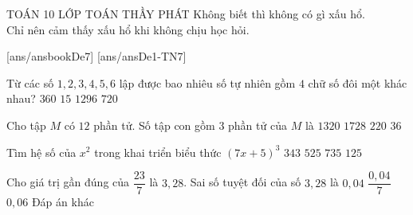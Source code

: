 \begin{name}
	{\tenchude}
	{TOÁN 10}
	{LỚP TOÁN THẦY PHÁT}
	{{Không biết thì không có gì xấu hổ.\\ Chỉ nên cảm thấy xấu hổ khi không chịu học hỏi.}}
\end{name}
[ans/ansbookDe7]
\TN
{}[ans/ansDe1-TN7]
\begin{ex}%
Từ các số $1,2,3,4,5,6$ lập được bao nhiêu số tự nhiên gồm $4$ chữ số đôi một khác nhau?
\choice
{\True $360$}
{$15$}
{$1296$}
{$720$}
\end{ex}

\begin{ex}%
Cho tập $M$ có $12$ phần tử. Số tập con gồm $3$ phần tử của $M$ là
\choice
{$1320$}
{$1728$}
{\True $220$}
{$36$}
\end{ex}

\begin{ex}%
Tìm hệ số của $x^2$  trong khai triển biểu thức $(7x + 5)^{3}$
\choice
{$343$}
{$525$}
{\True $735$}
{$125$}
\end{ex}

\begin{ex}%
Cho giá trị gần đúng của $\dfrac{23}{7}$ là $3{,}28$. Sai số tuyệt đối của số $3{,}28$ là
\choice
{$0{,}04$}
{\True $\dfrac{0,04}{7}$}
{$0{,}06$}
{Đáp án khác}
\end{ex}

